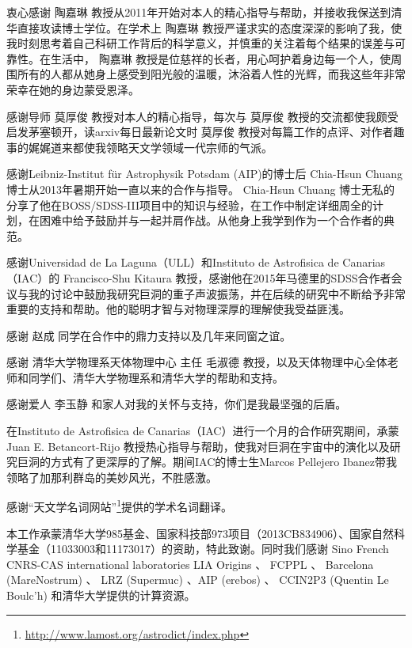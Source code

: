 \begin{acknowledgement}
  衷心感谢 陶嘉琳 教授从2011年开始对本人的精心指导与帮助，并接收我保送到清华直接攻读博士学位。在学术上 陶嘉琳 教授严谨求实的态度深深的影响了我，使我时刻思考着自己科研工作背后的科学意义，并慎重的关注着每个结果的误差与可靠性。在生活中， 陶嘉琳 教授是位慈祥的长者，用心呵护着身边每一个人，使周围所有的人都从她身上感受到阳光般的温暖，沐浴着人性的光辉，而我这些年非常荣幸在她的身边蒙受恩泽。

  感谢导师 莫厚俊 教授对本人的精心指导，每次与 莫厚俊 教授的交流都使我颇受启发茅塞顿开，读arxiv每日最新论文时 莫厚俊 教授对每篇工作的点评、对作者趣事的娓娓道来都使我领略天文学领域一代宗师的气派。

  感谢Leibniz-Institut f\"ur Astrophysik Potsdam (AIP)的博士后 Chia-Hsun Chuang 博士从2013年暑期开始一直以来的合作与指导。 Chia-Hsun Chuang 博士无私的分享了他在BOSS/SDSS-III项目中的知识与经验，在工作中制定详细周全的计划，在困难中给予鼓励并与一起并肩作战。从他身上我学到作为一个合作者的典范。

  感谢Universidad de La Laguna（ULL）和Instituto de Astrofisica de Canarias（IAC）的 Francisco-Shu Kitaura 教授，感谢他在2015年马德里的SDSS合作者会议与我的讨论中鼓励我研究巨洞的重子声波振荡，并在后续的研究中不断给予非常重要的支持和帮助。他的聪明才智与对物理深厚的理解使我受益匪浅。

  感谢 赵成 同学在合作中的鼎力支持以及几年来同窗之谊。

  感谢 清华大学物理系天体物理中心 主任 毛淑德 教授，以及天体物理中心全体老师和同学们、清华大学物理系和清华大学的帮助和支持。

  感谢爱人 李玉静 和家人对我的关怀与支持，你们是我最坚强的后盾。

  在Instituto de Astrofisica de Canarias（IAC）进行一个月的合作研究期间，承蒙 Juan E. Betancort-Rijo 教授热心指导与帮助，使我对巨洞在宇宙中的演化以及研究巨洞的方式有了更深厚的了解。期间IAC的博士生Marcos Pellejero Ibanez带我领略了加那利群岛的美妙风光，不胜感激。

  感谢“天文学名词网站”\footnote{\url{http://www.lamost.org/astrodict/index.php}}提供的学术名词翻译。

  本工作承蒙清华大学985基金、国家科技部973项目（2013CB834906）、国家自然科学基金（11033003和11173017）的资助，特此致谢。同时我们感谢 Sino French CNRS-CAS international laboratories LIA Origins 、 FCPPL 、 Barcelona (MareNostrum) 、 LRZ (Supermuc) 、AIP (erebos) 、 CCIN2P3 (Quentin Le Boulc’h) 和清华大学提供的计算资源。


\end{acknowledgement}
